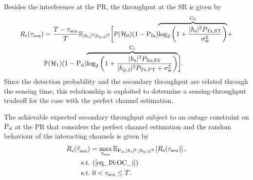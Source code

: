 Besides the interference at the PR, the throughput at the SR is given by %
\begin{align}
R_{\text{s}}(\tau_{\text{sen}}) &= \frac{T - \tau_{\text{sen}}}{T} \mathbb{E}_{|h_{\text{s}}|^2 |h_{\text{p,2}}|^2} \bigg[ \mathbb P(\mathcal{H}_0) (1 - \text{P}_{\text{fa}}) \smash[b]{\overbrace{\log_2 \bigg( 1 + \frac{|h_{\text{s}}|^2 P_{\text{Tx,ST}}}{\sigma^2_{\text{w}}} \bigg)}^{\text{C}_{\text{0}}}} + \nonumber \\ & \mathbb P(\mathcal{H}_1) (1 - \text{P}_{\text{d}}) \smash[b]{\overbrace{\log_2 \bigg( 1 + \frac{|h_{\text{s}}|^2 P_{\text{Tx,ST}}}{|h_{\text{p,2}}|^2 P_{\text{Tx,PT}} + \sigma^2_{\text{w}}} \bigg)}^{\text{C}_{\text{1}}}} \bigg]. \label{eq_IS:thr_i} 
\end{align}
Since the detection probability and the secondary throughput are related through the sensing time, this relationship is exploited to determine a sensing-throughput tradeoff for the case with the perfect channel estimation.
\begin{theorem} \label{th_IS:th3}
\normalfont
The achievable expected secondary throughput subject to an outage constraint on $\text{P}_{\text{d}}$ at the PR that considers the perfect channel estimation and the random behaviour of the interacting channels is given by
\begin{align}
{R}_{\text{s}}^{\text{}}(\tilde{\tau}_{\text{sen}}^{\text{}}) &= \operatorname*{max}_{\tau_{\text{sen}}} {\mathbb E}_{\text{P}_{\text{d}}, |h_{\text{s}}|^2, |h_{\text{p,2}}|^2}\left[ R_{\text{s}}(\tau_{\text{sen}}) \right], \label{eq_IS:STT_i} \\
\text{s.t.} & \text{ }  (\ref{eq_IS:OC_i}) \nonumber \\ 
\text{s.t.} & \text{ }  0 < \tau_{\text{sen}} \le T. \nonumber
\end{align}
\end{theorem}
